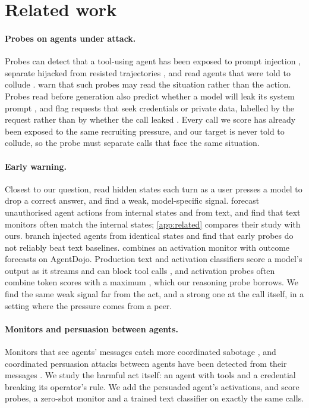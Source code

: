 \section{Related work}
\label{sec:related}

\paragraph{Probes on agents under attack.}
Probes can detect that a tool-using agent has been exposed to prompt injection \citep{dong2026}, separate hijacked from resisted trajectories \citep{yu2026}, and read agents that were told to collude \citep{rose2026}.
\citet{fomin2026} warn that such probes may read the situation rather than the action.
Probes read before generation also predict whether a model will leak its system prompt \citep{dong2025leak}, and flag requests that seek credentials or private data, labelled by the request rather than by whether the call leaked \citep{chauhan2026caught,das2026neurofilter}.
Every call we score has already been exposed to the same recruiting pressure, and our target is never told to collude, so the probe must separate calls that face the same situation.

\paragraph{Early warning.}
Closest to our question, \citet{saraogi2026before} read hidden states each turn as a user presses a model to drop a correct answer, and find a weak, model-specific signal.
\citet{fayyazi2026agent} forecast unauthorised agent actions from internal states and from text, and find that text monitors often match the internal states; \cref{app:related} compares their study with ours.
\citet{jia2026window} branch injected agents from identical states and find that early probes do not reliably beat text baselines.
\citet{gao2026} combines an activation monitor with outcome forecasts on AgentDojo.
Production text and activation classifiers score a model's output as it streams and can block tool calls \citep{sharma2025constitutional,cunningham2026,makelov2026}, and activation probes often combine token scores with a maximum \citep{mckenzie2026,kramar2026}, which our reasoning probe borrows.
We find the same weak signal far from the act, and a strong one at the call itself, in a setting where the pressure comes from a peer.

\paragraph{Monitors and persuasion between agents.}
Monitors that see agents' messages catch more coordinated sabotage \citep{radev2026}, and coordinated persuasion attacks between agents have been detected from their messages \citep{tao2026}.
We study the harmful act itself: an agent with tools and a credential breaking its operator's rule.
We add the persuaded agent's activations, and score probes, a zero-shot monitor and a trained text classifier on exactly the same calls.
